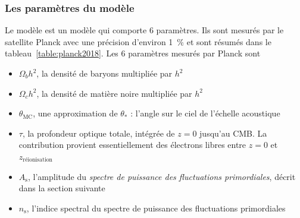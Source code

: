 \subsubsection{Les paramètres du modèle} 
Le modèle \lcdm{} est un modèle qui comporte 6 paramètres. Ils sont mesurés par le satellite Planck \autocite{Collaboration2018} avec une précision d'environ 1~\% et sont résumés dans le tableau~\ref{table:planck2018}. Les 6 paramètres mesurés par Planck sont
\begin{itemize}
\item $\Omega_bh^2$, la densité de baryons multipliée par $h^2$
\item $\Omega_ch^2$, la densité de matière noire multipliée par $h^2$
\item $\theta_{\mathrm{MC}}$, une approximation de $\theta_*$ : l'angle sur le ciel de l'échelle acoustique
\item $\tau$, la profondeur optique totale, intégrée de $z=0$ jusqu'au CMB. La contribution provient essentiellement des électrons libres entre $z = 0$ et $z_{\mathrm{réionisation}}$
\item $A_\mathrm{s}$, l'amplitude du \emph{spectre de puissance des fluctuations primordiales}, décrit dans la section suivante
\item $n_\mathrm{s}$, l'indice spectral du spectre de puissance des fluctuations primordiales
\end{itemize}


